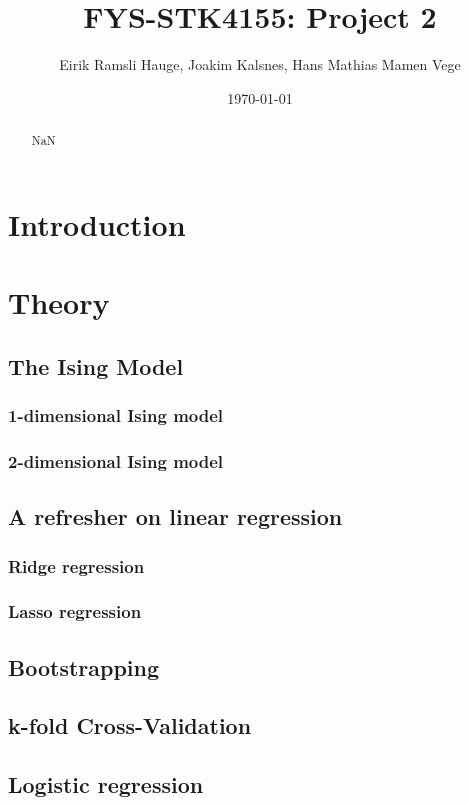 \documentclass[11pt]{article}
\title{FYS-STK4155: Project 2}
\author{Eirik Ramsli Hauge, Joakim Kalsnes, Hans Mathias Mamen Vege}
\date{\today}
\begin{document}
\maketitle

\begin{abstract}
NaN
\end{abstract}

\tableofcontents


\section{Introduction}

\section{Theory}
\subsection{The Ising Model}
\subsubsection{1-dimensional Ising model}
\subsubsection{2-dimensional Ising model}

\subsection{A refresher on linear regression}
\subsubsection{Ridge regression}
\subsubsection{Lasso regression}

\subsection{Bootstrapping}
\subsection{k-fold Cross-Validation}

\subsection{Logistic regression}
\end{document}
